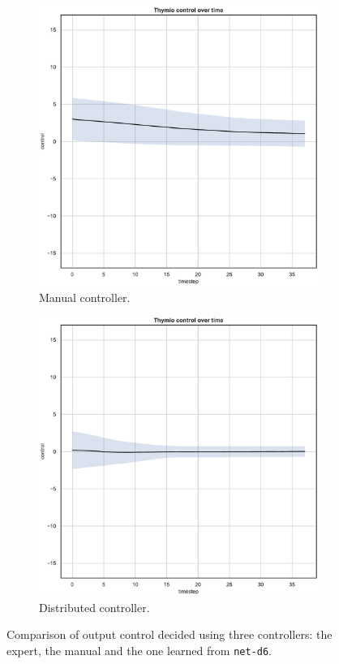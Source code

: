 \begin{figure}[!htb]
\begin{subfigure}[h]{0.3\textwidth}
		\includegraphics[width=\textwidth]{contents/images/net-d6/control-overtime-manual}%
		\caption{Manual controller.}
	\end{subfigure}
	\hfill
	\begin{subfigure}[h]{0.3\textwidth}
		\centering
		\includegraphics[width=\textwidth]{contents/images/net-d6/control-overtime-learned_distributed}
		\caption{Distributed controller.}
	\end{subfigure}
	\caption[Evaluation of the control decided by \texttt{net-d6}.]{Comparison 
		of output control decided using three controllers: the expert, the manual 
		and the one learned from \texttt{net-d6}.}
	\label{fig:net-d6control}
\end{figure}

